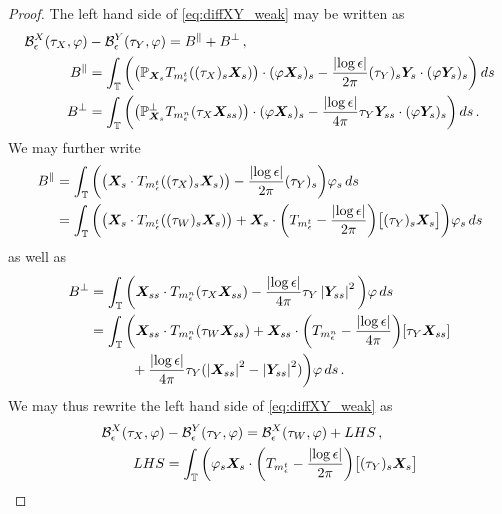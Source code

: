 \documentclass[10pt,a4paper]{amsart}
\renewcommand{\P}{\mathbb{P}}
\newcommand{\T}{\mathbb{T}}
\newcommand{\X}{\bm{X}}
\newcommand{\Y}{\bm{Y}}
\newcommand{\abs}[1]{\left\lvert #1 \right\rvert}
\newcommand{\mc}[1]{\mathcal{#1}}
\begin{document}
\begin{proof}
The left hand side of \eqref{eq:diffXY_weak} may be written as 
\begin{equation}
\begin{aligned}
  \mc{B}_\epsilon^X(\tau_X,\varphi) &- \mc{B}_\epsilon^Y(\tau_Y,\varphi)= B^\parallel +B^\perp \,,\\
  B^\parallel &= \int_\T \bigg(\big(\P_{\X_s}T_{m_\epsilon^{\rm t}}((\tau_X)_s\X_s)\big)\cdot(\varphi\X_s)_s -\frac{\abs{\log\epsilon}}{2\pi}(\tau_Y)_s\Y_s\cdot(\varphi\Y_s)_s \bigg)\,ds \\
  B^\perp &= \int_\T \bigg( \big(\P_{\X_s}^\perp T_{m_\epsilon^{\rm n}}(\tau_X\X_{ss})\big)\cdot(\varphi\X_s)_s  -\frac{\abs{\log\epsilon}}{4\pi}\tau_Y\Y_{ss} \cdot(\varphi\Y_s)_s \bigg)\,ds\,.
\end{aligned}
\end{equation}
%
We may further write 
\begin{equation}
\begin{aligned}
  B^\parallel &= \int_\T \bigg(\big(\X_s\cdot T_{m_\epsilon^{\rm t}}((\tau_X)_s\X_s)\big) -\frac{\abs{\log\epsilon}}{2\pi}(\tau_Y)_s \bigg)\varphi_s\,ds \\
  &= \int_\T \bigg(\big(\X_s\cdot T_{m_\epsilon^{\rm t}}((\tau_W)_s\X_s)\big) + \X_s\cdot\bigg(T_{m_\epsilon^{\rm t}}-\frac{\abs{\log\epsilon}}{2\pi}\bigg)\big[(\tau_Y)_s\X_s\big] \bigg)\varphi_s\,ds
\end{aligned}
\end{equation}
as well as 
\begin{equation}
\begin{aligned}
 B^\perp &= \int_\T \bigg( \X_{ss}\cdot T_{m_\epsilon^{\rm n}}(\tau_X\X_{ss})  -\frac{\abs{\log\epsilon}}{4\pi}\tau_Y\abs{\Y_{ss}}^2 \bigg)\varphi\,ds \\
  &= \int_\T \bigg( \X_{ss}\cdot T_{m_\epsilon^{\rm n}}(\tau_W\X_{ss}) + \X_{ss}\cdot\bigg(T_{m_\epsilon^{\rm n}} -\frac{\abs{\log\epsilon}}{4\pi}\bigg)[\tau_Y\X_{ss}] \\
  &\qquad\quad + \frac{\abs{\log\epsilon}}{4\pi}\tau_Y(\abs{\X_{ss}}^2-\abs{\Y_{ss}}^2) \bigg)\varphi\,ds \,.
\end{aligned}
\end{equation}
%
We may thus rewrite the left hand side of \eqref{eq:diffXY_weak} as 
\begin{equation}
\begin{aligned}
  \mc{B}_\epsilon^X(\tau_X,\varphi) &- \mc{B}_\epsilon^Y(\tau_Y,\varphi)= \mc{B}_\epsilon^X(\tau_W,\varphi) + {\rm LHS}\,,\\
  {\rm LHS}&= \int_\T \bigg( \varphi_s\X_s\cdot\bigg(T_{m_\epsilon^{\rm t}}-\frac{\abs{\log\epsilon}}{2\pi}\bigg)\big[(\tau_Y)_s\X_s\big] \\

\end{aligned}
\end{equation}
\end{proof}
\end{document}
